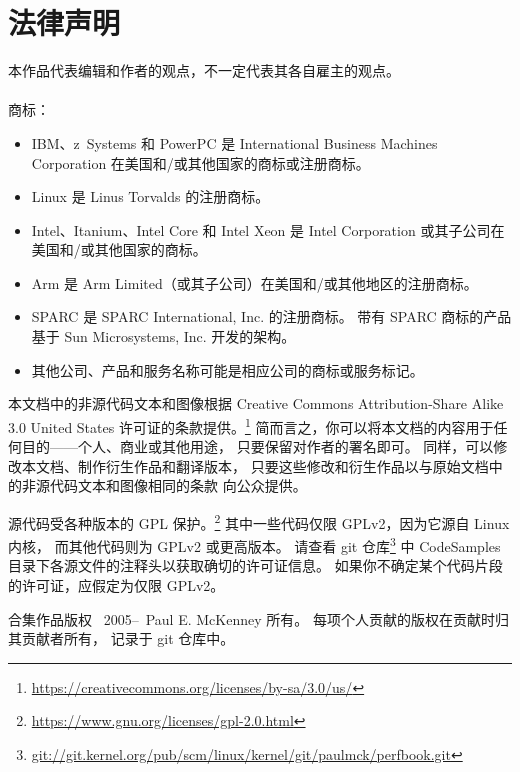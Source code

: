 
\section*{法律声明}

本作品代表编辑和作者的观点，不一定代表其各自雇主的观点。\\
\\
商标：
\begin{itemize}
\item	IBM、z~Systems 和 PowerPC 是 International Business Machines Corporation
	在美国和/或其他国家的商标或注册商标。
\item	Linux 是 Linus Torvalds 的注册商标。
\item	Intel、Itanium、Intel Core 和 Intel Xeon 是
	Intel Corporation 或其子公司在美国和/或其他国家的商标。
\item	Arm 是 Arm Limited（或其子公司）在美国和/或其他地区的注册商标。
\item	SPARC 是 SPARC International, Inc. 的注册商标。
	带有 SPARC 商标的产品基于 Sun Microsystems, Inc. 开发的架构。
\item	其他公司、产品和服务名称可能是相应公司的商标或服务标记。
\end{itemize}

本文档中的非源代码文本和图像根据 Creative Commons
Attribution-Share Alike 3.0 United States 许可证的条款提供。\footnote{
	\url{https://creativecommons.org/licenses/by-sa/3.0/us/}}
简而言之，你可以将本文档的内容用于任何目的——个人、商业或其他用途，
只要保留对作者的署名即可。
同样，可以修改本文档、制作衍生作品和翻译版本，
只要这些修改和衍生作品以与原始文档中的非源代码文本和图像相同的条款
向公众提供。

源代码受各种版本的 GPL 保护。\footnote{
	\url{https://www.gnu.org/licenses/gpl-2.0.html}}
其中一些代码仅限 GPLv2，因为它源自 Linux 内核，
而其他代码则为 GPLv2 或更高版本。
请查看 git 仓库\footnote{
	\url{git://git.kernel.org/pub/scm/linux/kernel/git/paulmck/perfbook.git}}
中 CodeSamples 目录下各源文件的注释头以获取确切的许可证信息。
如果你不确定某个代码片段的许可证，应假定为仅限 GPLv2。

合集作品版权 {\textcopyright}~2005--\commityear\ Paul E. McKenney 所有。
每项个人贡献的版权在贡献时归其贡献者所有，
记录于 git 仓库中。
